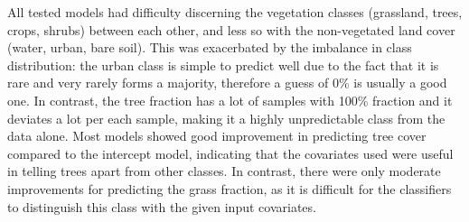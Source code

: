 \documentclass[a4paper,10pt]{article}
\begin{document}
All tested models had difficulty discerning the vegetation classes (grassland, trees, crops, shrubs) between each other, and less so with the non-vegetated land cover (water, urban, bare soil).
This was exacerbated by the imbalance in class distribution: the urban class is simple to predict well due to the fact that it is rare and very rarely forms a majority, therefore a guess of 0\% is usually a good one.
In contrast, the tree fraction has a lot of samples with 100\% fraction and it deviates a lot per each sample, making it a highly unpredictable class from the data alone.
Most models showed good improvement in predicting tree cover compared to the intercept model, indicating that the covariates used were useful in telling trees apart from other classes.
In contrast, there were only moderate improvements for predicting the grass fraction, as it is difficult for the classifiers to distinguish this class with the given input covariates.
\end{document}
